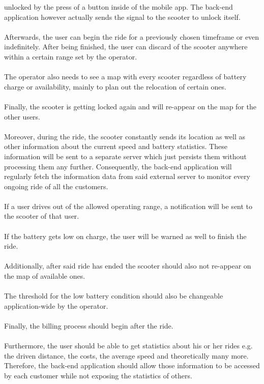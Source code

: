 \documentclass[12pt,a4paper]{report}
\begin{document}
unlocked by the press of a button inside of the mobile app.
The back-end application however actually sends the signal to the scooter to
unlock itself.\\\\
Afterwards, the user can begin the ride for a previously chosen timeframe
or even indefinitely. After being finished, the user can discard of the scooter
anywhere within a certain range set by the operator.\\\\
The operator also needs to see a map with every scooter regardless of battery
charge or availability, mainly to plan out the relocation of certain ones.\\\\
Finally, the scooter is getting locked again and will re-appear on the map for the other users.\\\\
Moreover, during the ride, the scooter constantly sends its location as well
as other information about the current speed and battery statistics.
These information will be sent to a separate server which just persists them
without processing them any further.
Consequently, the back-end application will regularly fetch the information data
from said external server to monitor every ongoing ride of all the customers.\\\\
If a user drives out of the allowed operating range, a notification will be sent
to the scooter of that user.\\\\
If the battery gets low on charge, the user will be warned as well to finish the ride.\\\\
Additionally, after said ride has ended the scooter should also not re-appear
on the map of available ones.\\\\
The threshold for the low battery condition should also be changeable
application-wide by the operator.\\\\
Finally, the billing process should begin after the ride.\\\\
Furthermore, the user should be able to get statistics about his or her rides
e.g. the driven distance, the costs, the average speed and theoretically
many more. Therefore, the back-end application should allow those information
to be accessed by each customer while not exposing the statistics of others.\\
\end{document}
